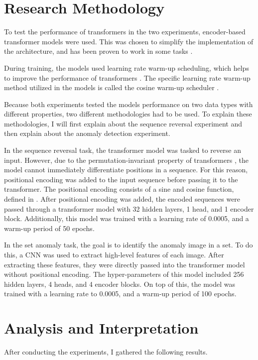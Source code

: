 \documentclass[peerreview]{IEEEtran}
\begin{document}
\section{Research Methodology}
To test the performance of transformers in the two experiments, encoder-based transformer models were used. This was chosen to simplify the implementation of the architecture, and has been proven to work in some tasks \cite{dosovitskiy_2021}\cite{devlin_2018}. 

During training, the models used learning rate warm-up scheduling, which helps to improve the performance of transformers \cite{liu_2020}. The specific learning rate warm-up method utilized in the models is called the cosine warm-up scheduler \cite{vaswani_2017}.

Because both experiments tested the models performance on two data types with different properties, two different methodologies had to be used. To explain these methodologies, I will first explain about the sequence reversal experiment and then explain about the anomaly detection experiment.

In the sequence reversal task, the transformer model was tasked to reverse an input. However, due to the permutation-invariant property of transformers \cite{naseer_2021}, the model cannot immediately differentiate positions in a sequence. For this reason, positional encoding was added to the input sequence before passing it to the transformer. The positional encoding consists of a sine and cosine function, defined in \cite{vaswani_2017}. After positional encoding was added, the encoded sequences were passed through a transformer model with 32 hidden layers, 1 head, and 1 encoder block. Additionally, this model was trained with a learning rate of 0.0005, and a warm-up period of 50 epochs.

In the set anomaly task, the goal is to identify the anomaly image in a set. To do this, a CNN was used to extract high-level features of each image. After extracting these features, they were directly passed into the transformer model without positional encoding. The hyper-parameters of this model included 256 hidden layers, 4 heads, and 4 encoder blocks. On top of this, the model was trained with a learning rate to 0.0005, and a warm-up period of 100 epochs.

\section{Analysis and Interpretation}
After conducting the experiments, I gathered the following results. 
\end{document}
